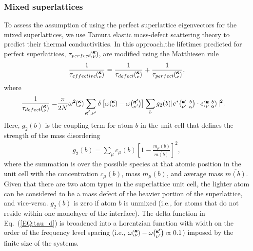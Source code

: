 \documentclass[aps,prb,preprint,preprintnumbers,amsmath,amssymb,floatfix,superscriptaddress]{revtex4}
\newcommand{\kvba}{\mspace{-4.0mu}\left(\mspace{-8.0mu}
\begin{smallmatrix} &\pmb{\kappa} &b \\ &\nu &\alpha\end{smallmatrix}
\mspace{-3.0mu}\right)}
\newcommand{\kvbap}{\mspace{-4.0mu}\left(\mspace{-8.0mu}
\begin{smallmatrix} &\pmb{\kappa}' &b \\ &\nu' &\alpha\end{smallmatrix}
\mspace{-3.0mu}\right)}
\newcommand{\kv}{\mspace{-4.0mu}\left(\mspace{-8.0mu}
\begin{smallmatrix}&\pmb{\kappa} \\&\nu\end{smallmatrix}
\mspace{-3.0mu}\right)}
\newcommand{\kvp}{\mspace{-4.0mu}\left(\mspace{-8.0mu}
\begin{smallmatrix}&\pmb{\kappa'} \\&\nu'\end{smallmatrix}
\mspace{-3.0mu}\right)}
\begin{document}
\subsubsection{Mixed superlattices}
To assess the assumption of using the perfect superlattice eigenvectors for the mixed superlattices, we use Tamura elastic mass-defect scattering theory to predict their thermal conductivities. \cite{tamura_isotope_1983} In this approach,the lifetimes predicted for perfect superlattices, $\tau_{perfect}\kv$, are modified using the Matthiesen rule %
\begin{equation}\label{EQ:tau_eff}
\begin{split}
\frac{1}{\tau_{effective}\kv} = \frac{1}{\tau_{defect}\kv}+\frac{1}{\tau_{perfect}\kv} ,
\end{split}
\end{equation}
where
\begin{equation}\label{EQ:tau_d}
\begin{split}
\frac{1}{\tau_{defect}\kv} = &\frac{\pi}{2N}\omega^2\kv \sum_{\pmb{\kappa'},\nu'} \delta\left[ \omega\kv - \omega\kvp \right]
\sum_{b} g_2(b) |e^*\kvbap \cdot e\kvba |^2 .
\end{split}
\end{equation}
Here, $g_2(b)$ is the coupling term for atom $b$ in the unit cell that defines the strength of the mass disordering
\begin{equation}\label{EQ:g(b)}
\begin{split}
g_2(b) = \sum_\mu c_{\mu}(b)\left[1-\frac{m_{\mu}(b)}{\overline{m(b)}}\right]^2, 
\end{split}
\end{equation}
where the summation is over the possible species at that atomic position in the unit cell with the concentration $c_\mu(b)$, mass $m_\mu(b)$, and average mass $\overline{m(b)}$. Given that there are two atom types in the superlattice unit cell, the lighter atom can be considered to be a mass defect of the heavier portion of the superlattice, and vice-versa. $g_2(b)$ is zero if atom $b$ is unmixed (i.e., for atoms that do not reside within one monolayer of the interface). The delta function in Eq.~(\ref{EQ:tau_d}) is broadened into a Lorentzian function with width on the order of the frequency level spacing (i.e., $\omega \kv -\omega \kvp \propto 0.1$) imposed by the finite size of the systems.\cite{allen_thermal_1993}
\end{document}
